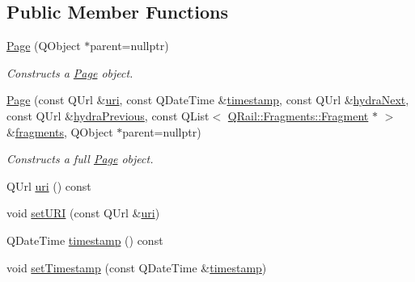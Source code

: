 \subsection*{Public Member Functions}
\begin{DoxyCompactItemize}
\item 
\mbox{\hyperlink{classQRail_1_1Fragments_1_1Page_ad674b8b6a51f72b955128f03f92f7927}{Page}} (Q\+Object $\ast$parent=nullptr)
\begin{DoxyCompactList}\small\item\em Constructs a \mbox{\hyperlink{classQRail_1_1Fragments_1_1Page}{Page}} object. \end{DoxyCompactList}\item 
\mbox{\hyperlink{classQRail_1_1Fragments_1_1Page_a44651659fab3540378a14906ef6c5ca4}{Page}} (const Q\+Url \&\mbox{\hyperlink{classQRail_1_1Fragments_1_1Page_a55b83d498119763fb6218ccb0959967e}{uri}}, const Q\+Date\+Time \&\mbox{\hyperlink{classQRail_1_1Fragments_1_1Page_aea27ab5b1a9aafe43afbc98ccb38f429}{timestamp}}, const Q\+Url \&\mbox{\hyperlink{classQRail_1_1Fragments_1_1Page_abac5d1c1b6bc72623725ac9585ed1a86}{hydra\+Next}}, const Q\+Url \&\mbox{\hyperlink{classQRail_1_1Fragments_1_1Page_abd9b826a513ec4f7ca3803cd52678596}{hydra\+Previous}}, const Q\+List$<$ \mbox{\hyperlink{classQRail_1_1Fragments_1_1Fragment}{Q\+Rail\+::\+Fragments\+::\+Fragment}} $\ast$ $>$ \&\mbox{\hyperlink{classQRail_1_1Fragments_1_1Page_a24f93fc23c2f2795fc3d662aed48c7d9}{fragments}}, Q\+Object $\ast$parent=nullptr)
\begin{DoxyCompactList}\small\item\em Constructs a full \mbox{\hyperlink{classQRail_1_1Fragments_1_1Page}{Page}} object. \end{DoxyCompactList}\item 
Q\+Url \mbox{\hyperlink{classQRail_1_1Fragments_1_1Page_a55b83d498119763fb6218ccb0959967e}{uri}} () const
\item 
void \mbox{\hyperlink{classQRail_1_1Fragments_1_1Page_ad29711549fc506722906445fd2e83bcf}{set\+U\+RI}} (const Q\+Url \&\mbox{\hyperlink{classQRail_1_1Fragments_1_1Page_a55b83d498119763fb6218ccb0959967e}{uri}})
\item 
Q\+Date\+Time \mbox{\hyperlink{classQRail_1_1Fragments_1_1Page_aea27ab5b1a9aafe43afbc98ccb38f429}{timestamp}} () const
\item 
void \mbox{\hyperlink{classQRail_1_1Fragments_1_1Page_a56f386c0514069d5a7013d1cab715a65}{set\+Timestamp}} (const Q\+Date\+Time \&\mbox{\hyperlink{classQRail_1_1Fragments_1_1Page_aea27ab5b1a9aafe43afbc98ccb38f429}{timestamp}})

\end{DoxyCompactItemize}
